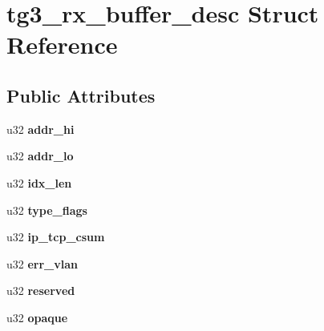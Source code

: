 \hypertarget{structtg3__rx__buffer__desc}{
\section{tg3\_\-rx\_\-buffer\_\-desc Struct Reference}
\label{structtg3__rx__buffer__desc}
}
\subsection*{Public Attributes}
\begin{DoxyCompactItemize}
\item 
\hypertarget{structtg3__rx__buffer__desc_affb7f862d880a59c081a4c994501a936}{
u32 {\bfseries addr\_\-hi}}
\label{structtg3__rx__buffer__desc_affb7f862d880a59c081a4c994501a936}

\item 
\hypertarget{structtg3__rx__buffer__desc_a0b0e3b8fe59350c4f9a0e42c89d2e972}{
u32 {\bfseries addr\_\-lo}}
\label{structtg3__rx__buffer__desc_a0b0e3b8fe59350c4f9a0e42c89d2e972}

\item 
\hypertarget{structtg3__rx__buffer__desc_ac87f3ff98259ab7f66a84dfb50d373ac}{
u32 {\bfseries idx\_\-len}}
\label{structtg3__rx__buffer__desc_ac87f3ff98259ab7f66a84dfb50d373ac}

\item 
\hypertarget{structtg3__rx__buffer__desc_a53d6d06739283dcdd323449b5034434a}{
u32 {\bfseries type\_\-flags}}
\label{structtg3__rx__buffer__desc_a53d6d06739283dcdd323449b5034434a}

\item 
\hypertarget{structtg3__rx__buffer__desc_ade4e7d40a3b3ac4b147a4d894223bc38}{
u32 {\bfseries ip\_\-tcp\_\-csum}}
\label{structtg3__rx__buffer__desc_ade4e7d40a3b3ac4b147a4d894223bc38}

\item 
\hypertarget{structtg3__rx__buffer__desc_af30a35cc5df1a4fed5399670d0da056a}{
u32 {\bfseries err\_\-vlan}}
\label{structtg3__rx__buffer__desc_af30a35cc5df1a4fed5399670d0da056a}

\item 
\hypertarget{structtg3__rx__buffer__desc_ace57fc3379a2a50825cb603f5d3feeb5}{
u32 {\bfseries reserved}}
\label{structtg3__rx__buffer__desc_ace57fc3379a2a50825cb603f5d3feeb5}

\item 
\hypertarget{structtg3__rx__buffer__desc_abcb21eaa38269413df8f7082993a212b}{
u32 {\bfseries opaque}}
\label{structtg3__rx__buffer__desc_abcb21eaa38269413df8f7082993a212b}

\end{DoxyCompactItemize}


